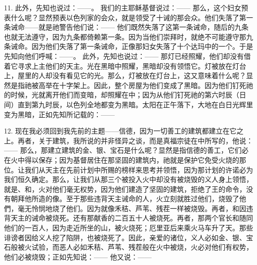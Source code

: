 11. 此外，先知也说过：——。 我们的主耶稣基督说过：—— 那么，这个妇女预表什么呢？显然预表以色列家的会众，就是领受了十诫的那会众。他们失落了第一条诫命——就是祂警告他们说：—— 他们既然失落了这第一条诫命，随后的九条也就无法遵守，因为九条都倚赖第一条。因为当他们崇拜时，就绝不可能遵守那九条诫命。因为他们失落了第一条诫命，正像那妇女失落了十个达玛中的一个。于是先知向他们呼喊：——。 此外，先知也说过：—— 那灯已经照耀，他们却没有借着它寻求上主他们的天主。光在黑暗中照耀，黑暗却没有领悟它。灯被放在灯台上，屋里的人却没有看见它的光。那么，灯被放在灯台上，这又意味着什么呢？显然是指祂被高举在十字架上。因此，整个房屋为他们变成了黑暗。因为他们钉死祂的时候，光就离开他们而变暗，却照耀在中；因为从他们钉死祂的第六时辰（日间）直到第九时辰，以色列全地都变为黑暗。太阳在正午落下，大地在白日光辉里变为黑暗，正如先知所记载的：——\par

12. 现在我必须回到我先前的主题——信德，因为一切善工的建筑都建立在它之上。再者，关于建筑，我所说的并非怪异之谈，而是真福宗徒在中所写的，他说：—— 那么，那建立建筑的金、银、宝石是什么呢？显然是指信德的善工，它们必在火中得以保存；因为基督居住在那坚固的建筑内，祂就是保护它免受火烧的那位。让我们从天主在先前计划中所赐的榜样来思考并领悟，因为那计划的许诺必为我们恒久确定。那么，让我们从那三个被投入火中却没有被烧毁的义人身上领悟，就是、和，火对他们毫无权势，因为他们建造了坚固的建筑，拒绝了王的命令，没有朝拜他所造的像。至于那些违背天主诫命的人，火立刻就胜过他们，烧毁了他們，毫无怜悯地烧了他们。因为就像禾秸、芦苇、残茬一样被烧毁。再者，和因违背天主的诫命被烧死。还有那献香的二百五十人被烧死。再者，那两个官长和随同他们的一百人，因为走近所坐的山，被火烧死；厄里亚后来乘火马车升了天。那些诽谤者因给义人挖了陷阱，也被烧死了。因此，亲爱的诸位，义人必如金、银、宝石般被火试验，而恶人必如禾秸、芦苇、残茬般在火中被烧，火必对他们有权势，他们必被烧毁；正如先知说：—— 他又说：——\par

